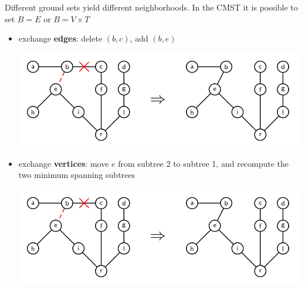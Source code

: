 Different ground sets yield different neighborhoods. In the CMST it is possible to set $B = E$ or $B = V \times T$
\begin{itemize}
	\item exchange \textbf{edges}: delete $(b, c)$, add $(b, e)$
	\begin{center}
		\includegraphics[width=0.85\columnwidth]{img/CMST1}
	\end{center}
	\nn
	
	\item exchange \textbf{vertices}: move $e$ from subtree 2 to subtree 1, and recompute the two minimum spanning subtrees
	\begin{center}
		\includegraphics[width=0.85\columnwidth]{img/CMST1}
	\end{center}
\end{itemize}

\newpage

